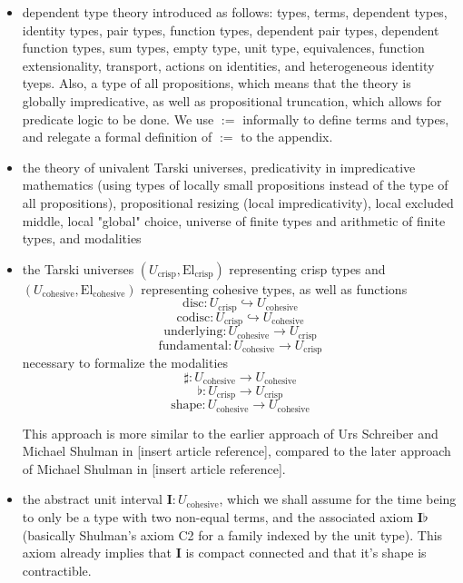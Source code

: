 \documentclass[one]{article}
\begin{document}
\begin{itemize}
\item dependent type theory introduced as follows: types, terms, dependent types, identity types, pair types, function types, dependent pair types, dependent function types, sum types, empty type, unit type, equivalences, function extensionality, transport, actions on identities, and heterogeneous identity tyeps. Also, a type of all propositions, which means that the theory is globally impredicative, as well as propositional truncation, which allows for predicate logic to be done. We use $:=$ informally to define terms and types, and relegate a formal definition of $:=$ to the appendix. 

\item the theory of univalent Tarski universes, predicativity in impredicative mathematics (using types of locally small propositions instead of the type of all propositions), propositional resizing (local impredicativity), local excluded middle, local "global" choice, universe of finite types and arithmetic of finite types, and modalities

\item the Tarski universes $(U_\mathrm{crisp}, \mathrm{El}_\mathrm{crisp})$ representing crisp types and $(U_\mathrm{cohesive}, \mathrm{El}_\mathrm{cohesive})$ representing cohesive types, as well as functions 
$$\mathrm{disc}:U_\mathrm{crisp} \hookrightarrow U_\mathrm{cohesive}$$ 
$$\mathrm{codisc}:U_\mathrm{crisp} \hookrightarrow U_\mathrm{cohesive}$$
$$\mathrm{underlying}:U_\mathrm{cohesive} \to U_\mathrm{crisp}$$ 
$$\mathrm{fundamental}:U_\mathrm{cohesive} \to U_\mathrm{crisp}$$ 
necessary to formalize the modalities 
$$\sharp:U_\mathrm{cohesive} \to U_\mathrm{cohesive}$$
$$\flat:U_\mathrm{crisp} \to U_\mathrm{crisp}$$
$$\mathrm{shape}:U_\mathrm{cohesive} \to U_\mathrm{cohesive}$$

This approach is more similar to the earlier approach of Urs Schreiber and Michael Shulman in [insert article reference], compared to the later approach of Michael Shulman in [insert article reference]. 

\item the abstract unit interval $\mathbf{I}:U_\mathrm{cohesive}$, which we shall assume for the time being to only be a type with two non-equal terms, and the associated axiom $\mathbf{I} \flat$ (basically Shulman's axiom C2 for a family indexed by the unit type). This axiom already implies that $\mathbf{I}$ is compact connected and that it's shape is contractible. 

\end{itemize}
\end{document}
